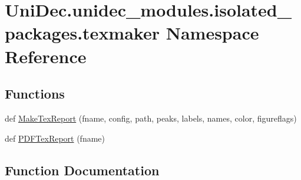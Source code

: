\hypertarget{namespace_uni_dec_1_1unidec__modules_1_1isolated__packages_1_1texmaker}{}\section{Uni\+Dec.\+unidec\+\_\+modules.\+isolated\+\_\+packages.\+texmaker Namespace Reference}
\label{namespace_uni_dec_1_1unidec__modules_1_1isolated__packages_1_1texmaker}
\subsection*{Functions}
\begin{DoxyCompactItemize}
\item 
def \hyperlink{namespace_uni_dec_1_1unidec__modules_1_1isolated__packages_1_1texmaker_a7c831bae279e159101a0020f139fd92f}{Make\+Tex\+Report} (fname, config, path, peaks, labels, names, color, figureflags)
\item 
def \hyperlink{namespace_uni_dec_1_1unidec__modules_1_1isolated__packages_1_1texmaker_a4253739e90b8ebd6a54b67e9b2e9487f}{P\+D\+F\+Tex\+Report} (fname)
\end{DoxyCompactItemize}


\subsection{Function Documentation}
\hypertarget{namespace_uni_dec_1_1unidec__modules_1_1isolated__packages_1_1texmaker_a7c831bae279e159101a0020f139fd92f}{}
